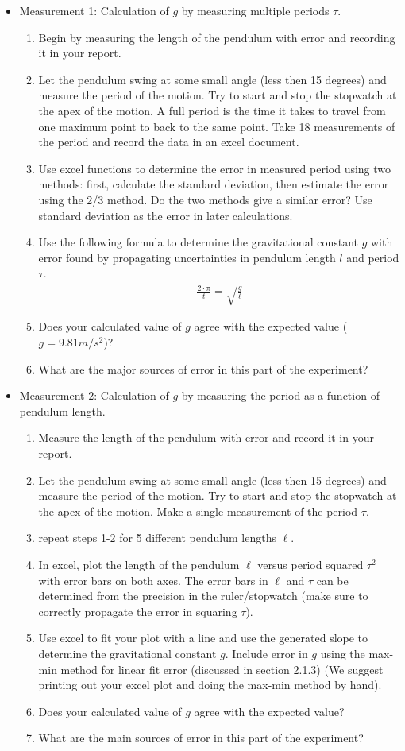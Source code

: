 \begin{itemize}
\item Measurement 1: Calculation of $g$ by measuring multiple periods $\tau$.
\begin{enumerate}
\item Begin by measuring the length of the pendulum with error and recording it in your report.
\item Let the pendulum swing at some small angle (less then 15 degrees) and measure the period of the motion. Try to start and stop the stopwatch at the apex of the motion. A full period is the time it takes to travel from one maximum point to back to the same point. Take 18 measurements of the period and record the data in an excel document.
\item Use excel functions to determine the error in measured period using two methods: first, calculate the standard deviation, then estimate the error using the 2/3 method. Do the two methods give a similar error? Use standard deviation as the error in later calculations.
\item Use the following formula to determine the gravitational constant $g$ with error found by propagating uncertainties in pendulum length $l$ and period $\tau$.
\begin{gather}
 \frac{2\cdot \pi}{t} = \sqrt{\frac{g}{\ell}}
\end{gather}
\item Does your calculated value of $g$ agree with the expected value ($g=9.81 m/s^2$)?
\item What are the major sources of error in this part of the experiment?
\end{enumerate}
\item Measurement 2: Calculation of $g$ by measuring the period as a function of pendulum length.
\begin{enumerate}
\item Measure the length of the pendulum with error and record it in your report.
\item Let the pendulum swing at some small angle (less then 15 degrees) and measure the period of the motion. Try to start and stop the stopwatch at the apex of the motion. Make a single measurement of the period $\tau$.
\item repeat steps 1-2 for 5 different pendulum lengths $\ell$. 
\item In excel, plot the length of the pendulum $\ell$ versus period squared $\tau^2$ with error bars on both axes. The error bars in $\ell$ and $\tau$ can be determined from the precision in the ruler/stopwatch (make sure to correctly propagate the error in squaring $\tau$).
\item Use excel to fit your plot with a line and use the generated slope to determine the gravitational constant $g$. Include error in $g$ using the max-min method for linear fit error (discussed in section 2.1.3) (We suggest printing out your excel plot and doing the max-min method by hand).
\item Does your calculated value of $g$ agree with the expected value?
\item What are the main sources of error in this part of the experiment?
\end{enumerate}
\end{itemize}
